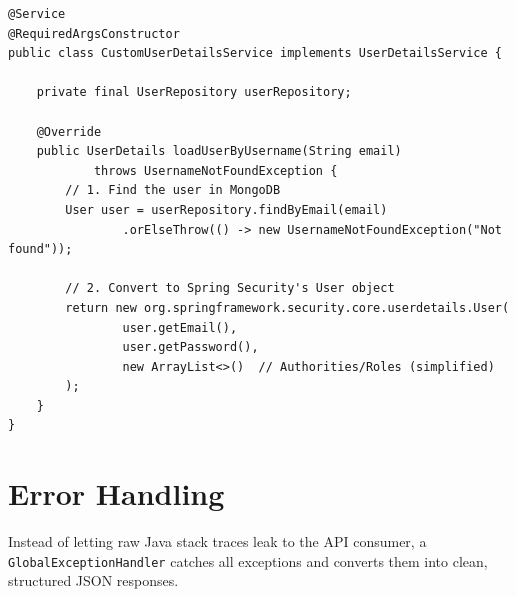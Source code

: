 \documentclass[11pt, a4paper]{article}
\begin{document}
\begin{lstlisting}[caption={CustomUserDetailsService.java}]
@Service
@RequiredArgsConstructor
public class CustomUserDetailsService implements UserDetailsService {

    private final UserRepository userRepository;

    @Override
    public UserDetails loadUserByUsername(String email)
            throws UsernameNotFoundException {
        // 1. Find the user in MongoDB
        User user = userRepository.findByEmail(email)
                .orElseThrow(() -> new UsernameNotFoundException("Not found"));

        // 2. Convert to Spring Security's User object
        return new org.springframework.security.core.userdetails.User(
                user.getEmail(),
                user.getPassword(),
                new ArrayList<>()  // Authorities/Roles (simplified)
        );
    }
}
\end{lstlisting}


\section{Error Handling}

Instead of letting raw Java stack traces leak to the API consumer, a \texttt{GlobalExceptionHandler} catches all exceptions and converts them into clean, structured JSON responses.
\end{document}
